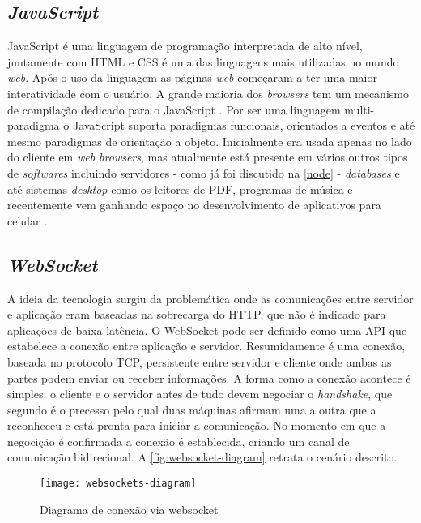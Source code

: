 \subsection[\textit{JavaScript}]{\textit{JavaScript}}\label{js}
JavaScript é uma linguagem de programação interpretada de alto nível, juntamente com HTML e CSS é uma das linguagens mais utilizadas no mundo \textit{web}.
Após o uso da linguagem as páginas \textit{web} começaram a ter uma maior interatividade com o usuário. A grande maioria dos \textit{browsers} tem um
mecanismo de compilação dedicado para o JavaScript \cite{ref-js}. Por ser uma linguagem multi-paradigma o JavaScript suporta paradigmas funcionais, orientados a eventos 
e até mesmo paradigmas de orientação a objeto.
Inicialmente era usada apenas no lado do cliente em \textit{web browsers}, mas atualmente está presente em vários outros tipos de \textit{softwares} incluindo
servidores - como já foi discutido na \autoref{node} - \textit{databases} e até sistemas \textit{desktop} como os leitores de PDF, programas de música e recentemente
vem ganhando espaço no desenvolvimento de aplicativos para celular \cite{ref-jsmobile}.

\subsection[\textit{WebSocket}]{\textit{WebSocket}}\label{websocket}
A ideia da tecnologia surgiu da problemática onde as comunicações entre servidor e aplicação eram baseadas na sobrecarga do HTTP, que não é indicado para aplicações
de baixa latência. O WebSocket pode ser definido como uma API que estabelece a conexão entre aplicação e servidor. Resumidamente é uma conexão, baseada no protocolo TCP, persistente
entre servidor e cliente onde ambas as partes podem enviar ou receber informações. A forma como a conexão acontece é simples:
o cliente e o servidor antes de tudo devem negociar o \textit{handshake}, que segundo \cite{ref-handshake} é o precesso pelo qual duas máquinas afirmam uma a outra que a reconheceu e está pronta para iniciar a comunicação.
No momento em que a negocição é confirmada a conexão é establecida, criando um canal de comunicação bidirecional. A \autoref{fig:websocket-diagram} retrata o cenário descrito.

\begin{figure}[h!]
	\texttt{[image: websockets-diagram]}
	\centering
	\caption[Diagrama de conexão via websocket]{Diagrama de conexão via websocket}
	\label{fig:websocket-diagram}
\end{figure}
\FloatBarrier


